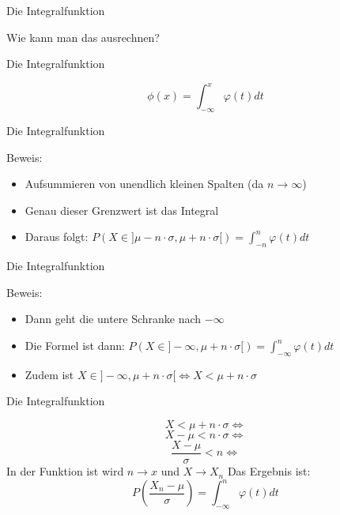 \documentclass[14pt]{beamer}
\begin{document}
\begin{frame} {Die Integralfunktion}

Wie kann man das ausrechnen?

\end{frame}

\begin{frame} {Die Integralfunktion}

$$ \phi(x) = \int_{-\infty}^x \varphi(t)dt $$

\end{frame}

\begin{frame} {Die Integralfunktion}

Beweis:

 \begin{itemize}
  \item Aufsummieren von unendlich kleinen Spalten (da $n \rightarrow   \infty$)
  \item Genau dieser Grenzwert ist das Integral
  \item Daraus folgt: $ P(X \in ] \mu - n \cdot \sigma, \mu + n \cdot \sigma[) = \int_{-n}^{n}\varphi(t)dt $
 \end{itemize}

\end{frame}

\begin{frame} {Die Integralfunktion}

Beweis:

 \begin{itemize}
  \item Dann geht die untere Schranke nach $ - \infty $
  \item Die Formel ist dann: $ P(X \in ] -\infty, \mu + n \cdot \sigma[) = \int_{-\infty}^n\varphi(t)dt $
  \item Zudem ist $ X \in ]-\infty, \mu + n \cdot \sigma[ \Leftrightarrow X < \mu + n \cdot \sigma $
 \end{itemize}

\end{frame}

\begin{frame} {Die Integralfunktion}

 $$ X < \mu + n \cdot \sigma \Leftrightarrow $$ $$ X - \mu < n \cdot \sigma \Leftrightarrow $$ $$ \frac{X - \mu}{\sigma} < n \Leftrightarrow $$
 In der Funktion ist wird $ n \rightarrow x $ und $ X \rightarrow X_n $
 Das Ergebnis ist:
 $$ P\left(\frac{X_n - \mu}{\sigma}\right) = \int_{-\infty}^n\varphi(t)dt  $$

\end{frame}
\end{document}
